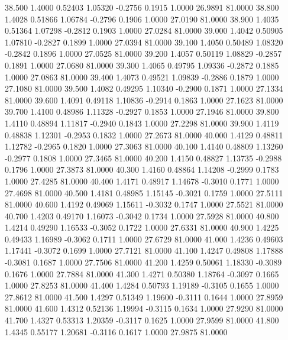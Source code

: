   38.500   1.4000   0.52403   1.05320  -0.2756   0.1915   1.0000  26.9891  81.0000
  38.800   1.4028   0.51866   1.06784  -0.2796   0.1906   1.0000  27.0190  81.0000
  38.900   1.4035   0.51364   1.07298  -0.2812   0.1903   1.0000  27.0284  81.0000
  39.000   1.4042   0.50905   1.07810  -0.2827   0.1899   1.0000  27.0394  81.0000
  39.100   1.4050   0.50489   1.08320  -0.2842   0.1896   1.0000  27.0525  81.0000
  39.200   1.4057   0.50119   1.08829  -0.2857   0.1891   1.0000  27.0680  81.0000
  39.300   1.4065   0.49795   1.09336  -0.2872   0.1885   1.0000  27.0863  81.0000
  39.400   1.4073   0.49521   1.09839  -0.2886   0.1879   1.0000  27.1080  81.0000
  39.500   1.4082   0.49295   1.10340  -0.2900   0.1871   1.0000  27.1334  81.0000
  39.600   1.4091   0.49118   1.10836  -0.2914   0.1863   1.0000  27.1623  81.0000
  39.700   1.4100   0.48986   1.11328  -0.2927   0.1853   1.0000  27.1946  81.0000
  39.800   1.4110   0.48894   1.11817  -0.2940   0.1843   1.0000  27.2298  81.0000
  39.900   1.4119   0.48838   1.12301  -0.2953   0.1832   1.0000  27.2673  81.0000
  40.000   1.4129   0.48811   1.12782  -0.2965   0.1820   1.0000  27.3063  81.0000
  40.100   1.4140   0.48809   1.13260  -0.2977   0.1808   1.0000  27.3465  81.0000
  40.200   1.4150   0.48827   1.13735  -0.2988   0.1796   1.0000  27.3873  81.0000
  40.300   1.4160   0.48864   1.14208  -0.2999   0.1783   1.0000  27.4285  81.0000
  40.400   1.4171   0.48917   1.14678  -0.3010   0.1771   1.0000  27.4698  81.0000
  40.500   1.4181   0.48985   1.15145  -0.3021   0.1759   1.0000  27.5111  81.0000
  40.600   1.4192   0.49069   1.15611  -0.3032   0.1747   1.0000  27.5521  81.0000
  40.700   1.4203   0.49170   1.16073  -0.3042   0.1734   1.0000  27.5928  81.0000
  40.800   1.4214   0.49290   1.16533  -0.3052   0.1722   1.0000  27.6331  81.0000
  40.900   1.4225   0.49433   1.16989  -0.3062   0.1711   1.0000  27.6729  81.0000
  41.000   1.4236   0.49603   1.17441  -0.3072   0.1699   1.0000  27.7121  81.0000
  41.100   1.4247   0.49808   1.17888  -0.3081   0.1687   1.0000  27.7506  81.0000
  41.200   1.4259   0.50061   1.18330  -0.3089   0.1676   1.0000  27.7884  81.0000
  41.300   1.4271   0.50380   1.18764  -0.3097   0.1665   1.0000  27.8253  81.0000
  41.400   1.4284   0.50793   1.19189  -0.3105   0.1655   1.0000  27.8612  81.0000
  41.500   1.4297   0.51349   1.19600  -0.3111   0.1644   1.0000  27.8959  81.0000
  41.600   1.4312   0.52136   1.19994  -0.3115   0.1634   1.0000  27.9290  81.0000
  41.700   1.4327   0.53313   1.20359  -0.3117   0.1625   1.0000  27.9599  81.0000
  41.800   1.4345   0.55177   1.20681  -0.3116   0.1617   1.0000  27.9875  81.0000
